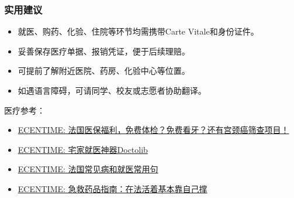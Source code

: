 \subsubsection{实用建议}
\begin{itemize}
    \item 就医、购药、化验、住院等环节均需携带Carte Vitale和身份证件。
    \item 妥善保存医疗单据、报销凭证，便于后续理赔。
    \item 可提前了解附近医院、药房、化验中心等位置。
    \item 如遇语言障碍，可请同学、校友或志愿者协助翻译。
\end{itemize}

医疗参考：
\begin{itemize}
    \item \href{https://www.ecentime.com/article/ecentime-ameli-gratuit}{ECENTIME: 法国医保福利，免费体检？免费看牙？还有宫颈癌筛查项目！}
    \item \href{https://www.ecentime.com/article/comment-utiliser-doctolib-pendant-le-confinement}{ECENTIME: 宅家就医神器Doctolib}
    \item \href{https://www.dealmoon.fr/guide/1366}{ECENTIME: 法国常见病和就医常用句}
    \item \href{https://www.ecentime.com/article/2018-pharmacie-list}{ECENTIME: 急救药品指南：在法活着基本靠自己撑}
\end{itemize}
